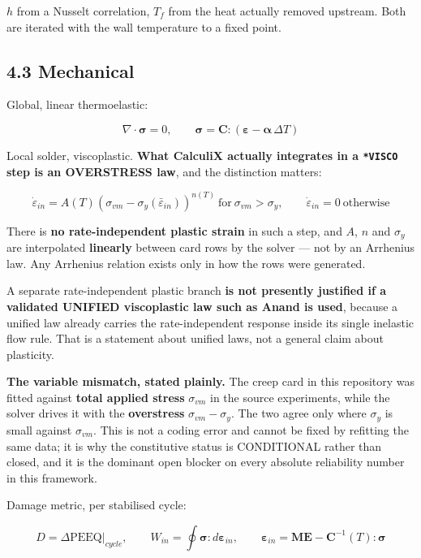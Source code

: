\documentclass[10pt,]{article}
\begin{document}
\(h\) from a Nusselt correlation, \(T_f\) from the heat actually removed
upstream. Both are iterated with the wall temperature to a fixed point.

\hypertarget{mechanical}{%
\subsection{4.3 Mechanical}\label{mechanical}}

Global, linear thermoelastic:

\[\nabla \cdot \boldsymbol{\sigma} = 0, \qquad \boldsymbol{\sigma} = \mathbf{C} : \left( \boldsymbol{\varepsilon} - \boldsymbol{\alpha}\,\Delta T \right)\]

Local solder, viscoplastic. \textbf{What CalculiX actually integrates in
a \texttt{*VISCO} step is an OVERSTRESS law}, and the distinction
matters:

\[\dot{\varepsilon}_{in} = A(T)\left( \sigma_{vm} - \sigma_y(\bar{\varepsilon}_{in}) \right)^{n(T)} \ \text{for}\ \sigma_{vm} > \sigma_y, \qquad \dot{\varepsilon}_{in} = 0 \ \text{otherwise}\]

There is \textbf{no rate-independent plastic strain} in such a step, and
\(A\), \(n\) and \(\sigma_y\) are interpolated \textbf{linearly} between
card rows by the solver --- not by an Arrhenius law. Any Arrhenius
relation exists only in how the rows were generated.

A separate rate-independent plastic branch \textbf{is not presently
justified if a validated UNIFIED viscoplastic law such as Anand is
used}, because a unified law already carries the rate-independent
response inside its single inelastic flow rule. That is a statement
about unified laws, not a general claim about plasticity.

\textbf{The variable mismatch, stated plainly.} The creep card in this
repository was fitted against \textbf{total applied stress}
\(\sigma_{vm}\) in the source experiments, while the solver drives it
with the \textbf{overstress} \(\sigma_{vm} - \sigma_y\). The two agree
only where \(\sigma_y\) is small against \(\sigma_{vm}\). This is not a
coding error and cannot be fixed by refitting the same data; it is why
the constitutive status is CONDITIONAL rather than closed, and it is the
dominant open blocker on every absolute reliability number in this
framework.

Damage metric, per stabilised cycle:

\[D = \Delta \text{PEEQ}\big|_{cycle}, \qquad W_{in} = \oint \boldsymbol{\sigma} : d\boldsymbol{\varepsilon}_{in}, \qquad \boldsymbol{\varepsilon}_{in} = \mathbf{ME} - \mathbf{C}^{-1}(T):\boldsymbol{\sigma}\]
\end{document}
